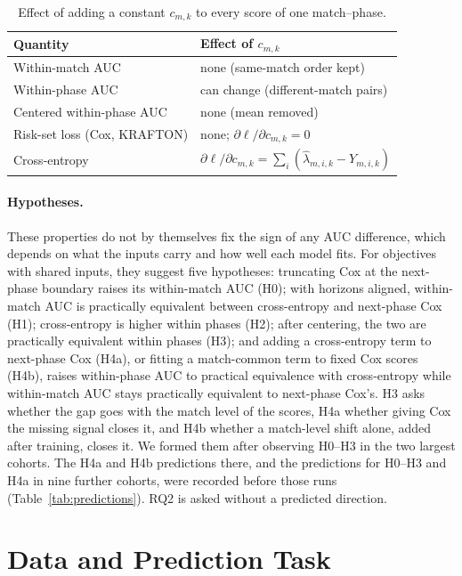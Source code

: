 \documentclass[sigconf,anonymous]{acmart}
\begin{document}
\begin{table}[t]
\centering\footnotesize
\caption{Effect of adding a constant $c_{m,k}$ to every score of one match--phase.}
\label{tab:account}
\setlength{\tabcolsep}{3pt}
\begin{tabular}{ll}
\toprule
Quantity & Effect of $c_{m,k}$ \\
\midrule
Within-match AUC & none (same-match order kept) \\
Within-phase AUC & can change (different-match pairs) \\
Centered within-phase AUC & none (mean removed) \\
Risk-set loss (Cox, KRAFTON) & none; $\partial\ell/\partial c_{m,k}=0$ \\
Cross-entropy & $\partial\ell/\partial c_{m,k}=\sum_{i}(\hat\lambda_{m,i,k}-Y_{m,i,k})$ \\
\bottomrule
\end{tabular}
\end{table}

\paragraph{Hypotheses.}
These properties do not by themselves fix the sign of any AUC difference, which depends on what the inputs carry and how well each model fits. For objectives with shared inputs, they suggest five hypotheses: truncating Cox at the next-phase boundary raises its within-match AUC (H0); with horizons aligned, within-match AUC is practically equivalent between cross-entropy and next-phase Cox (H1); cross-entropy is higher within phases (H2); after centering, the two are practically equivalent within phases (H3); and adding a cross-entropy term to next-phase Cox (H4a), or fitting a match-common term to fixed Cox scores (H4b), raises within-phase AUC to practical equivalence with cross-entropy while within-match AUC stays practically equivalent to next-phase Cox's. H3 asks whether the gap goes with the match level of the scores, H4a whether giving Cox the missing signal closes it, and H4b whether a match-level shift alone, added after training, closes it. We formed them after observing H0--H3 in the two largest cohorts. The H4a and H4b predictions there, and the predictions for H0--H3 and H4a in nine further cohorts, were recorded before those runs (Table~\ref{tab:predictions}). RQ2 is asked without a predicted direction.

\section{Data and Prediction Task}
\label{sec:method}
\end{document}
